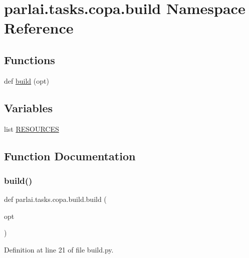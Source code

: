 \hypertarget{namespaceparlai_1_1tasks_1_1copa_1_1build}{}\section{parlai.\+tasks.\+copa.\+build Namespace Reference}
\label{namespaceparlai_1_1tasks_1_1copa_1_1build}
\subsection*{Functions}
\begin{DoxyCompactItemize}
\item 
def \hyperlink{namespaceparlai_1_1tasks_1_1copa_1_1build_a20917f15c830f6a3c2af55808ee584bf}{build} (opt)
\end{DoxyCompactItemize}
\subsection*{Variables}
\begin{DoxyCompactItemize}
\item 
list \hyperlink{namespaceparlai_1_1tasks_1_1copa_1_1build_a62573c3b2b21231246c8e91efdb78c4e}{R\+E\+S\+O\+U\+R\+C\+ES}
\end{DoxyCompactItemize}


\subsection{Function Documentation}
\mbox{\label{namespaceparlai_1_1tasks_1_1copa_1_1build_a20917f15c830f6a3c2af55808ee584bf}} 
\subsubsection{\texorpdfstring{build()}{build()}}
{\footnotesize\ttfamily def parlai.\+tasks.\+copa.\+build.\+build (\begin{DoxyParamCaption}\item[{}]{opt }\end{DoxyParamCaption})}



Definition at line 21 of file build.\+py.


